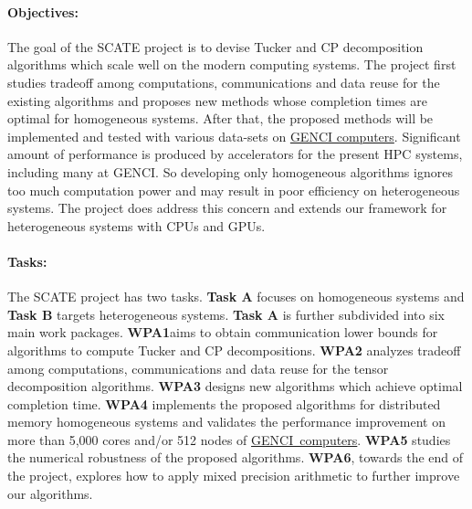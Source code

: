\documentclass[a4paper,11pt]{article}
\begin{document}
	\paragraph{Objectives:} The goal of the SCATE project is to devise Tucker and CP decomposition algorithms which scale well on the modern computing systems. The project first studies tradeoff among computations, communications and data reuse for the existing algorithms and proposes new methods whose completion times are optimal for homogeneous systems. After that, the proposed methods will be implemented and tested with various data-sets on \href{https://www.genci.fr/en/our-computers}{GENCI computers}. Significant amount of performance is produced by accelerators for the present HPC systems, including many at GENCI. So developing only homogeneous algorithms ignores too much computation power and may result in poor efficiency on heterogeneous systems. The project does address this concern and extends our framework for heterogeneous systems with CPUs and GPUs.

		
	
	

	
	\paragraph{Tasks:}
	The SCATE project has two tasks. \textbf{Task A} focuses on homogeneous systems and \textbf{Task B} targets heterogeneous systems. \textbf{Task A} is further subdivided into six main work packages. \textbf{WPA1}\newline aims to obtain communication lower bounds for algorithms to compute Tucker and CP decompositions. \textbf{WPA2} analyzes tradeoff among computations, communications and data reuse for the tensor decomposition algorithms. \textbf{WPA3} designs new algorithms which achieve optimal completion time. \textbf{WPA4} implements the proposed algorithms for distributed memory homogeneous systems and validates the performance improvement on more than 5,000 cores and/or 512 nodes of \mbox{\href{https://www.genci.fr/en/our-computers}{GENCI computers}}. \textbf{WPA5} studies the numerical robustness of the proposed algorithms.
	\textbf{WPA6}, towards the end of the project, explores how to apply mixed precision arithmetic to further improve our algorithms.
	
\end{document}
